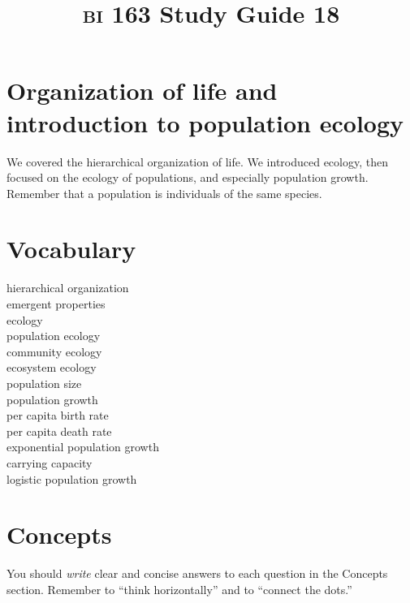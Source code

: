 \documentclass[letterpaper]{tufte-handout}
\title{{\scshape bi} 163 Study Guide 18}
\date{} %
\begin{document}
\maketitle	%

\section*{Organization of life and introduction to population ecology}

We covered the hierarchical organization of life. We introduced ecology, then focused on the ecology of populations, and especially population growth.  Remember that a population is individuals of the same species.

\section*{Vocabulary}

\vspace{-1\baselineskip}
\begin{multicols}{2}
hierarchical organization \\
emergent properties \\
ecology\\
population ecology\\
community ecology \\
ecosystem ecology \\
population size\\
population growth\\
per capita birth rate\\
per capita death rate\\
exponential population growth\\
carrying capacity\\
logistic population growth\\
\end{multicols}

\section*{Concepts}

You should \emph{write} clear and concise answers to each question in the Concepts section.  Remember to ``think horizontally'' and to ``connect the dots.'' 
\end{document}
